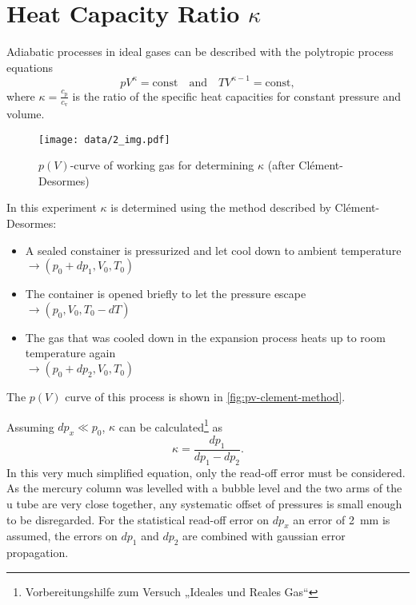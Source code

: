 \chapter{Heat Capacity Ratio $\kappa$}

Adiabatic processes in ideal gases can be described with the polytropic process equations
\begin{equation}
	pV^\kappa = \text{const} \quad \text{and} \quad TV^{\kappa - 1} = \text{const},
\end{equation}
where $\kappa = \frac{c_\text{p}}{c_\text{v}}$ is the ratio of the specific heat capacities for constant pressure and volume.

\begin{figure}[tbp]
	\centering
	\texttt{[image: data/2\_img.pdf]}
	\caption{$p(V)$-curve of working gas for determining $\kappa$ (after Clément-Desormes)}
	\label{fig:pv-clement-method}
\end{figure}

In this experiment $\kappa$ is determined using the method described by Clément-Desormes:
\begin{itemize}
	\item A sealed constainer is pressurized and let cool down to ambient temperature\\
	\mbox{$\rightarrow (p_0 + dp_1, V_0, T_0)$}
	\item The container is opened briefly to let the pressure escape\\
	\mbox{$\rightarrow (p_0, V_0, T_0 - dT)$}
	\item The gas that was cooled down in the expansion process heats up to room temperature again\\
	\mbox{$\rightarrow (p_0 + dp_2, V_0, T_0)$}
\end{itemize}
The $p(V)$ curve of this process is shown in \autoref{fig:pv-clement-method}.

Assuming $dp_x \ll p_0$, $\kappa$ can be calculated\footnote{Vorbereitungshilfe zum Versuch „Ideales und Reales Gas“} as
\begin{equation}
	\kappa = \frac{dp_1}{dp_1 - dp_2}.
\end{equation}
In this very much simplified equation, only the read-off error must be considered.
As the mercury column was levelled with a bubble level and the two arms of the u tube are very close together, any systematic offset of pressures is small enough to be disregarded.
For the statistical read-off error on $dp_x$ an error of \SI{2}{\milli\meter} is assumed, the errors on $dp_1$ and $dp_2$ are combined with gaussian error propagation.

